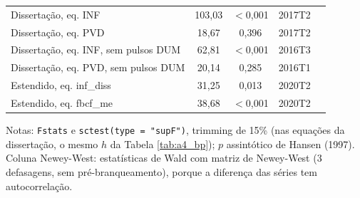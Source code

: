 \begin{table}[htbp]
\begin{tabular}{lcccc}
Disserta\c{c}\~ao, eq. INF & 103{,}03 & $<$0{,}001 & 2017T2 & \\
Disserta\c{c}\~ao, eq. PVD & 18{,}67 & 0{,}396 & 2017T2 & \\
Disserta\c{c}\~ao, eq. INF, sem pulsos DUM & 62{,}81 & $<$0{,}001 & 2016T3 & \\
Disserta\c{c}\~ao, eq. PVD, sem pulsos DUM & 20{,}14 & 0{,}285 & 2016T1 & \\
Estendido, eq. inf\_diss & 31{,}25 & 0{,}013 & 2020T2 & \\
Estendido, eq. fbcf\_me & 38{,}68 & $<$0{,}001 & 2020T2 & \\
\bottomrule
\end{tabular}
\begin{minipage}{0.97\linewidth}\footnotesize
\medskip Notas: \texttt{Fstats} e \texttt{sctest(type = "supF")}, trimming de 15\% (nas equa\c{c}\~oes da disserta\c{c}\~ao, o mesmo $h$ da Tabela \ref{tab:a4_bp}); $p$ assint\'otico de Hansen (1997). Coluna Newey-West: estat\'isticas de Wald com matriz de Newey-West (3 defasagens, sem pr\'e-branqueamento), porque a diferen\c{c}a das s\'eries tem autocorrela\c{c}\~ao.
\end{minipage}
\end{table}

